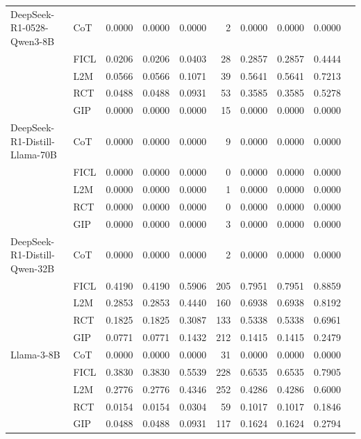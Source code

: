 \documentclass[conference]{IEEEtran}
\begin{document}
\begin{longtable}{p{3.5cm} l r r r r r r r r}
DeepSeek-R1-0528-Qwen3-8B & CoT  & 0.0000 & 0.0000 & 0.0000 & 2  & 0.0000 & 0.0000 & 0.0000 \\
                          & FICL & 0.0206 & 0.0206 & 0.0403 & 28 & 0.2857 & 0.2857 & 0.4444 \\
                          & L2M  & 0.0566 & 0.0566 & 0.1071 & 39 & 0.5641 & 0.5641 & 0.7213 \\
                          & RCT  & 0.0488 & 0.0488 & 0.0931 & 53 & 0.3585 & 0.3585 & 0.5278 \\
                          & GIP  & 0.0000 & 0.0000 & 0.0000 & 15 & 0.0000 & 0.0000 & 0.0000 \\
DeepSeek-R1-Distill-Llama-70B & CoT  & 0.0000 & 0.0000 & 0.0000 & 9  & 0.0000 & 0.0000 & 0.0000 \\
                          & FICL & 0.0000 & 0.0000 & 0.0000 & 0  & 0.0000 & 0.0000 & 0.0000 \\
                          & L2M  & 0.0000 & 0.0000 & 0.0000 & 1  & 0.0000 & 0.0000 & 0.0000 \\
                          & RCT  & 0.0000 & 0.0000 & 0.0000 & 0  & 0.0000 & 0.0000 & 0.0000 \\
                          & GIP  & 0.0000 & 0.0000 & 0.0000 & 3  & 0.0000 & 0.0000 & 0.0000 \\
DeepSeek-R1-Distill-Qwen-32B & CoT  & 0.0000 & 0.0000 & 0.0000 & 2  & 0.0000 & 0.0000 & 0.0000 \\
                          & FICL & 0.4190 & 0.4190 & 0.5906 & 205 & 0.7951 & 0.7951 & 0.8859 \\
                          & L2M  & 0.2853 & 0.2853 & 0.4440 & 160 & 0.6938 & 0.6938 & 0.8192 \\
                          & RCT  & 0.1825 & 0.1825 & 0.3087 & 133 & 0.5338 & 0.5338 & 0.6961 \\
                          & GIP  & 0.0771 & 0.0771 & 0.1432 & 212 & 0.1415 & 0.1415 & 0.2479 \\
Llama-3-8B                & CoT  & 0.0000 & 0.0000 & 0.0000 & 31  & 0.0000 & 0.0000 & 0.0000 \\
                          & FICL & 0.3830 & 0.3830 & 0.5539 & 228 & 0.6535 & 0.6535 & 0.7905 \\
                          & L2M  & 0.2776 & 0.2776 & 0.4346 & 252 & 0.4286 & 0.4286 & 0.6000 \\
                          & RCT  & 0.0154 & 0.0154 & 0.0304 & 59  & 0.1017 & 0.1017 & 0.1846 \\
                          & GIP  & 0.0488 & 0.0488 & 0.0931 & 117 & 0.1624 & 0.1624 & 0.2794 \\

\end{longtable}
\end{document}
